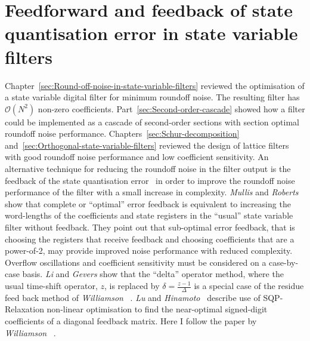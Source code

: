 \documentclass[a4paper,twoside,10pt,english]{report}
\begin{document}
\chapter{Feedforward and feedback of state quantisation error in state variable filters}
Chapter~\ref{sec:Round-off-noise-in-state-variable-filters} reviewed the 
optimisation of a state variable digital filter for minimum roundoff noise. The
resulting filter has $\mathcal{O}\left(N^{2}\right)$ non-zero coefficients. 
Part~\ref{sec:Second-order-cascade} showed how a filter could be implemented as
a cascade of second-order sections with section optimal roundoff noise 
performance. Chapters~\ref{sec:Schur-decomposition}
and~\ref{sec:Orthogonal-state-variable-filters} reviewed the design of lattice
filters with good roundoff noise performance and low coefficient sensitivity.
An alternative technique for reducing the roundoff noise in the filter output is
the feedback of the state quantisation 
error~\cite{SpangShultheiss_ReductionOfQuantizingNoiseByFeedback,
LuHinamoto_JointlyOptimizedErrorFeedbackStateSpaceFilters,
Williamson_RoundoffNoiseMinimizationUsingResidueFeedback} in order to improve
the roundoff noise performance of the filter with a small increase in 
complexity. \emph{Mullis} and
\emph{Roberts}~\cite{MullisRoberts_InterpretationOfErrorSpectrumShapingInDigitalFilters}
show that complete or ``optimal'' error feedback is equivalent to increasing the 
word-lengths of the coefficients and state registers in the ``usual'' state
variable filter without feedback. They point out that sub-optimal error
feedback, that is choosing the registers that receive feedback and choosing
coefficients that are a power-of-2, may provide improved noise performance with
reduced complexity. Overflow oscillations and coefficient sensitivity must be 
considered on a case-by-case basis. \emph{Li} and \emph{Gevers} show that the 
``delta'' operator method, where the usual time-shift operator, $z$, is 
replaced by $\delta = \frac{z-1}{\Delta}$ is a special case of the residue 
feed back method of 
\emph{Williamson}~\cite{Williamson_RoundoffNoiseMinimizationUsingResidueFeedback}
.
\emph{Lu} and 
\emph{Hinamoto}~\cite{LuHinamoto_JointlyOptimizedErrorFeedbackStateSpaceFilters} 
describe use of SQP-Relaxation non-linear optimisation to find the near-optimal
signed-digit coefficients of a diagonal feedback matrix. Here I follow the paper
by 
\emph{Williamson}~\cite{Williamson_RoundoffNoiseMinimizationUsingResidueFeedback}
.
\end{document}
